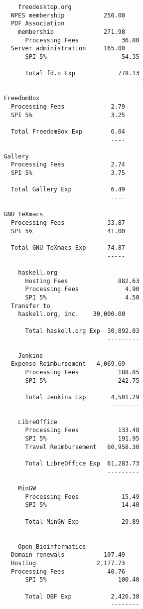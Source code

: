 \documentclass[letterpaper]{report}
\begin{document}
\begin{verbatim}
        freedesktop.org
	  NPES membership           250.00
	  PDF Association 
	    membership              271.98
          Processing Fees            36.80
	  Server administration     165.00
          SPI 5%                     54.35

          Total fd.o Exp            778.13
                                    ------

	FreedomBox
	  Processing Fees             2.79
	  SPI 5%                      3.25

	  Total FreedomBox Exp        6.04
	                              ----

	Gallery
	  Processing Fees             2.74
	  SPI 5%                      3.75

	  Total Gallery Exp           6.49
	                              ----

	GNU TeXmacs
	  Processing Fees            33.87
	  SPI 5%                     41.00

	  Total GNU TeXmacs Exp      74.87
	                             -----

        haskell.org
          Hosting Fees              882.63
          Processing Fees             4.90
          SPI 5%                      4.50
	  Transfer to 
	    haskell.org, inc.    30,000.00

          Total haskell.org Exp  30,892.03
                                 ---------

        Jenkins
	  Expense Reimbursement   4,069.69
          Processing Fees           188.85
          SPI 5%                    242.75

          Total Jenkins Exp       4,501.29
                                  --------

        LibreOffice
          Processing Fees           133.48
          SPI 5%                    191.95
          Travel Reimbursement   60,958.30

          Total LibreOffice Exp  61,283.73
                                 ---------

        MinGW
          Processing Fees            15.49
          SPI 5%                     14.40

          Total MinGW Exp            29.89
                                     -----

        Open Bioinformatics
	  Domain renewals           107.49
	  Hosting                 2,177.73
	  Processing Fees            40.76
          SPI 5%                    100.40

          Total OBF Exp           2,426.38
                                  --------


\end{verbatim}
\end{document}
